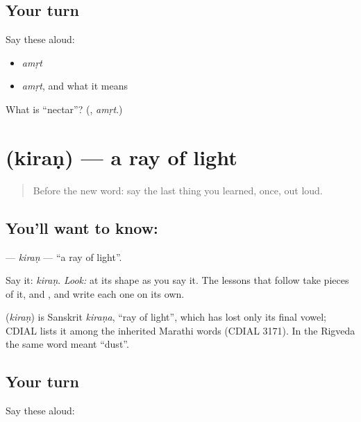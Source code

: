\subsection*{Your turn}
Say these aloud:

\begin{itemize}
\raggedright
  \item \emph{amṛt}
  \item \emph{amṛt}, and what it means
\end{itemize}

\begin{tcolorbox}[breakable,colback=teal!4,colframe=teal!35!black,title={Before you move on}]
What is \textquotedblleft{}nectar\textquotedblright{}? (\textbf{}, \emph{amṛt}.)
\end{tcolorbox}
\section[\texorpdfstring{\mr{किरण} (kiraṇ)}{किरण (kiraṇ)}]{ (kiraṇ) — a ray of light}

\label{lesson:MR-C05-kiran}



\begin{quote}
Before the new word: say the last thing you learned, once, out loud.
\end{quote}

\subsection*{You'll want to know: }
\textbf{} — \emph{kiraṇ} — \textquotedblleft{}a ray of light\textquotedblright{}.

Say it: \emph{kiraṇ}. \emph{Look:} at its shape as you say it. The lessons that follow take pieces of it, \textbf{} and \textbf{}, and write each one on its own.

\begin{cousinweb}
\textbf{} (\emph{kiraṇ}) is Sanskrit \emph{kiraṇa}, \textquotedblleft{}ray of light\textquotedblright{}, which has lost only its final vowel; CDIAL lists it among the inherited Marathi words (CDIAL 3171). In the Rigveda the same word meant \textquotedblleft{}dust\textquotedblright{}.
\end{cousinweb}

\subsection*{Your turn}
Say these aloud:

